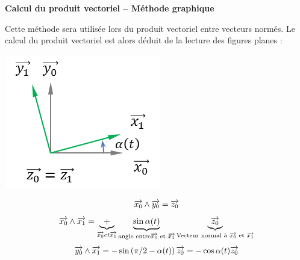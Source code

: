\documentclass[11pt,oneside]{article}
\begin{document}
\begin{methode}
\textbf{Calcul du produit vectoriel -- Méthode graphique}

Cette méthode sera utilisée lors du produit vectoriel entre vecteurs normés. Le calcul du produit vectoriel est alors déduit de la lecture des figures planes : 

\begin{minipage}[c]{.3\linewidth}
\begin{center}
\includegraphics[width=.9\textwidth]{png/alpha}
\end{center}
\end{minipage} \hfill
\begin{minipage}[c]{.65\linewidth}
$$
\overrightarrow{x_0}\wedge\overrightarrow{y_0}=\overrightarrow{z_0}
$$
$$
\overrightarrow{x_0}\wedge\overrightarrow{x_1}=
\underbrace{+}_{\overrightarrow{x_0} { et }\overrightarrow{x_1}} 
\underbrace{\sin \alpha(t)}_{\text{angle entre} \overrightarrow{x_0} \text{ et }\overrightarrow{x_1}} 
\underbrace{\overrightarrow{z_0}}_{\text{Vecteur normal à } \overrightarrow{x_0} \text{ et }\overrightarrow{x_1}}
$$
$$
\overrightarrow{y_0}\wedge\overrightarrow{x_1}
=- \sin\left( \pi/2 - \alpha(t)\right) \overrightarrow{z_0}
=- \cos \alpha(t) \overrightarrow{z_0}
$$
\end{minipage}

\end{methode}
\end{document}

